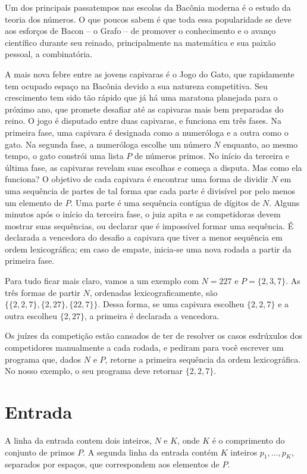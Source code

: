 Um dos principais passatempos nas escolas da Bacônia moderna é o estudo da teoria dos números. O que poucos sabem é
que toda essa popularidade se deve aos esforços de Bacon -- o Grafo -- de promover o conhecimento e o avanço
científico durante seu reinado, principalmente na matemática e sua paixão pessoal, a combinatória.

A mais nova febre entre as jovens capivaras é o Jogo do Gato, que rapidamente tem ocupado espaço na Bacônia devido a sua
natureza competitiva.
Seu crescimento tem sido tão rápido que já há uma maratona planejada para o próximo ano, que promete desafiar até as capivaras
mais bem preparadas do reino. O jogo é disputado entre duas capivaras, e funciona em três fases.
Na primeira fase, uma capivara é designada como a numeróloga e a outra como o gato.
Na segunda fase, a numeróloga escolhe um número $N$ enquanto, ao mesmo tempo, o gato constrói uma lista $P$ de números primos.
No início da terceira e última fase, as capivaras revelam suas escolhas e começa a disputa.
Mas como ela funciona? O objetivo de cada capivara é encontrar uma forma de dividir $N$ em uma sequência de partes
de tal forma que cada parte é divisível por pelo menos um elemento de $P$. Uma parte é uma sequência contígua de dígitos de $N$.
Alguns minutos após o início da terceira fase, o juiz apita e as competidoras devem mostrar suas sequências, ou declarar que é impossível
formar uma sequência.
É declarada a vencedora do desafio a capivara que tiver a menor sequência em ordem lexicográfica; em caso de empate,
inicia-se uma nova rodada a partir da primeira fase.

Para tudo ficar mais claro, vamos a um exemplo com $N = 227$ e $P = \{2, 3, 7\}$. As três formas de partir $N$, ordenadas lexicograficamente,
são $\{\{2,2,7\}, \{2,27\}, \{22,7\}\}$. Dessa forma, se uma capivara escolheu $\{2, 2, 7\}$ e a outra escolheu $\{2, 27\}$, a primeira é declarada
a vencedora.

Os juízes da competição estão cansados de ter de resolver os casos esdrúxulos dos competidores manualmente a cada rodada, e pediram para você
escrever um programa que, dados $N$ e $P$, retorne a primeira sequência da ordem lexicográfica. No nosso exemplo, o seu programa deve retornar
$\{2, 2, 7\}$.

\section*{Entrada}

A linha da entrada contem dois inteiros, $N$ e $K$, onde $K$ é o comprimento do conjunto de primos $P$.
A segunda linha da entrada contém $K$ inteiros $p_1, \dots, p_K$, separados por espaços, que correspondem aos elementos de $P$.

